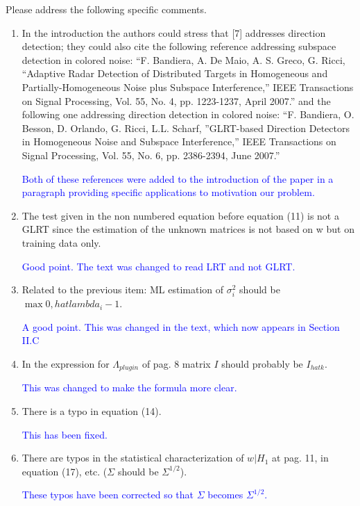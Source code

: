 \documentclass[11pt]{article}
\begin{document}
Please address the following specific comments.
\begin{enumerate}
\item In the introduction the authors could stress that [7] addresses direction detection; they could also cite the following reference
addressing subspace detection in colored noise:
``F. Bandiera, A. De Maio, A. S. Greco, G. Ricci, ``Adaptive Radar Detection of Distributed Targets in Homogeneous and Partially-Homogeneous
Noise plus Subspace Interference,'' IEEE Transactions on Signal Processing, Vol. 55, No. 4, pp. 1223-1237, April 2007.''
and the following one addressing direction detection in colored noise:
``F. Bandiera, O. Besson, D. Orlando, G. Ricci, L.L. Scharf, ''GLRT-based Direction Detectors  in Homogeneous Noise and Subspace Interference,'' IEEE Transactions on Signal Processing, Vol. 55, No. 6, pp. 2386-2394, June 2007.''

\textcolor{blue}{Both of these references were added to the introduction of the paper in a paragraph providing specific applications to motivation our problem.}

\item The test given in the non numbered equation before equation (11) is not a GLRT since the estimation of the unknown matrices is not based on w but on training data only.

  \textcolor{blue}{Good point. The text was changed to read LRT and not GLRT.}

\item Related to the previous item: ML estimation of $\sigma^2_i$ should be $\max{0, hat{lambda}_i-1}$.

  \textcolor{blue}{A good point. This was changed in the text, which now appears in Section II.C}

\item In the expression for $\Lambda_{plugin}$ of pag. 8 matrix $I$ should probably be $I_{hat{k}}$.

  \textcolor{blue}{This was changed to make the formula more clear.}

\item There is a typo in equation (14).

  \textcolor{blue}{This has been fixed.}

\item There are typos in the statistical characterization of $w|H_1$ at pag. 11, in equation (17), etc. ($\Sigma$ should be $\Sigma^{1/2}$).

  \textcolor{blue}{These typos have been corrected so that $\Sigma$ becomes $\Sigma^{1/2}$.}


\end{enumerate}
\end{document}
